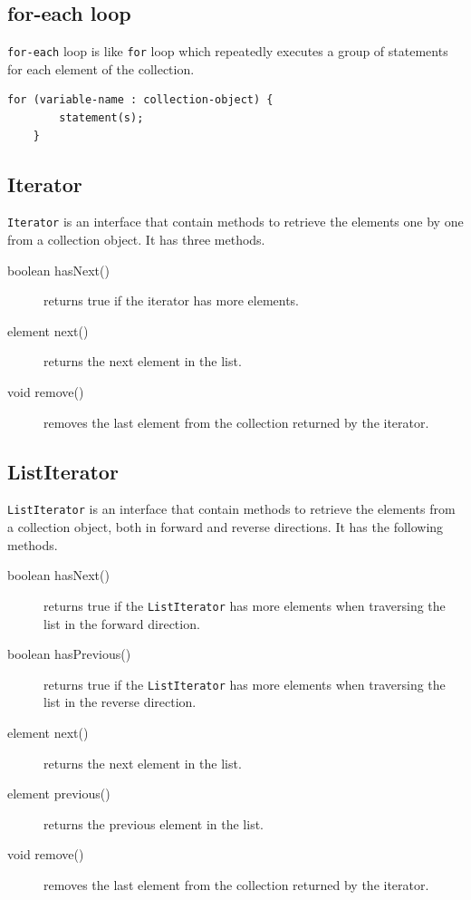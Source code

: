 \documentclass[11pt,a4paper]{article}
\begin{document}
\subsection*{for-each loop}
\texttt{for-each} loop is like \texttt{for} loop which repeatedly executes a group of statements for each element of the collection.
\begin{lstlisting}[numbers=none]
    for (variable-name : collection-object) {
        statement(s);
    }
\end{lstlisting}
\subsection*{Iterator}

\texttt{Iterator} is an interface that contain methods to retrieve the elements one by one from a collection object. It has three methods.
\begin{description}
\item [boolean hasNext() ] returns true if the iterator has more elements.
\item [element next() ] returns the next element in the list.
\item [void remove()] removes the last element from the collection returned by the iterator.
\end{description}

\subsection*{ListIterator}
\texttt{ListIterator} is an interface that contain methods to retrieve the elements from a collection object, both in forward and reverse directions. It has the following methods.
\begin{description}
\item [boolean hasNext()] returns true if the \texttt{ListIterator} has more elements when traversing the list  in the forward direction.
\item [boolean hasPrevious()] returns true if the \texttt{ListIterator} has more elements when traversing the list  in the reverse direction.
\item [element next() ] returns the next element in the list.
\item [element previous() ] returns the previous element in the list.
\item [void remove() ] removes the last element from the collection returned by the iterator.
\end{description}
\end{document}
